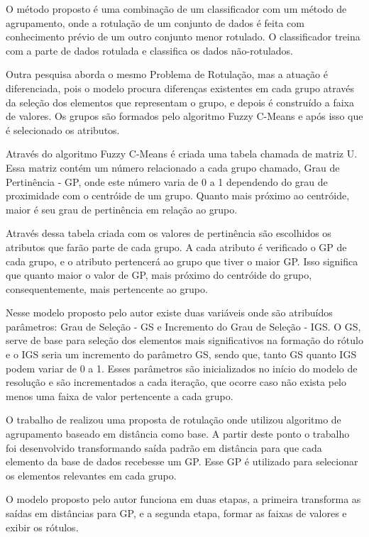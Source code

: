 O método proposto é uma combinação de um classificador com um método de agrupamento, onde a rotulação de um conjunto de dados é feita com conhecimento prévio de um outro conjunto menor rotulado. O classificador treina com a parte de dados rotulada e classifica os dados não-rotulados.


Outra pesquisa \cite{Filho2015}  aborda o mesmo Problema de Rotulação, mas a atuação é diferenciada, pois o modelo procura diferenças existentes em cada grupo através da seleção dos elementos que representam o grupo, e depois é construído a faixa de valores. Os grupos são formados pelo algoritmo Fuzzy C-Means e após isso que é selecionado os atributos. 

Através do algoritmo Fuzzy C-Means é criada uma tabela chamada de matriz U. Essa matriz contém um número relacionado a cada grupo chamado, Grau de Pertinência - GP, onde este número varia de 0 a 1 dependendo do grau de proximidade com o centróide de um grupo. Quanto mais próximo ao centróide, maior é seu grau de pertinência em relação ao grupo.

Através dessa tabela criada com os valores de pertinência são escolhidos os atributos que farão parte de cada grupo. A cada atributo é verificado o GP de cada grupo, e o atributo pertencerá ao grupo que tiver o maior GP. Isso significa que quanto maior o valor de GP, mais próximo do centróide do grupo, consequentemente, mais pertencente ao grupo. 

Nesse modelo proposto pelo autor existe duas variáveis onde são atribuídos parâmetros: Grau de Seleção - GS e Incremento do Grau de Seleção - IGS. O GS, serve de base para seleção dos elementos mais significativos na formação do rótulo e o IGS seria um incremento do parâmetro GS, sendo que, tanto GS quanto IGS podem variar de 0 a 1. Esses parâmetros são inicializados no início do modelo de resolução e são incrementados a cada iteração, que ocorre caso não exista pelo menos uma faixa de valor pertencente a cada grupo.

O trabalho de  realizou uma proposta de rotulação onde utilizou algoritmo de agrupamento baseado em distância como base. A partir deste ponto o trabalho foi desenvolvido transformando saída padrão em distância para que cada elemento da base de dados recebesse um GP. Esse GP é utilizado para selecionar os elementos relevantes em cada grupo.

O modelo proposto pelo autor funciona em duas etapas, a primeira transforma as saídas em distâncias para GP, e a segunda etapa, formar as faixas de valores e exibir os rótulos.

